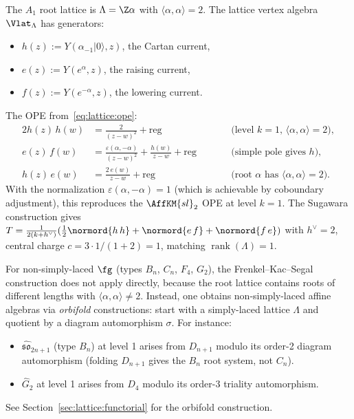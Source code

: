 \begin{example}
\label{ex:lattice:sl2-fks}
The $A_1$ root lattice is $\Lambda = \Z\alpha$ with
$\langle\alpha,\alpha\rangle = 2$.
The lattice vertex algebra $\Vlat_\Lambda$ has generators:
\begin{itemize}
\item $h(z) := Y(\alpha_{-1}|0\rangle, z)$, the Cartan current,
\item $e(z) := Y(e^\alpha, z)$, the raising current,
\item $f(z) := Y(e^{-\alpha}, z)$, the lowering current.
\end{itemize}
The OPE from~\eqref{eq:lattice:ope}:
\begin{alignat*}{2}
h(z)\,h(w) &= \frac{2}{(z-w)^2} + \text{reg}
 &\qquad &\text{(level $k = 1$, $\langle\alpha,\alpha\rangle = 2$)}, \\
e(z)\,f(w)
&= \frac{\varepsilon(\alpha,-\alpha)}{(z-w)^2}
 + \frac{h(w)}{z-w} + \text{reg}
 &\qquad &\text{(simple pole gives $h$)}, \\
h(z)\,e(w) &= \frac{2\,e(w)}{z-w} + \text{reg}
 &\qquad &\text{(root $\alpha$ has $\langle\alpha,\alpha\rangle=2$)}.
\end{alignat*}
With the normalization $\varepsilon(\alpha,-\alpha) = 1$ (which is
achievable by coboundary adjustment), this reproduces the $\AffKM{sl}_2$
OPE at level $k=1$. The Sugawara construction gives
$T = \frac{1}{2(k+h^\vee)}(\frac{1}{2}\normord{h\,h} +
\normord{e\,f} + \normord{f\,e})$
with $h^\vee = 2$, central charge $c = 3 \cdot 1/(1+2) = 1$,
matching $\operatorname{rank}(\Lambda) = 1$.
\end{example}

\begin{remark}\label{rem:lattice:non-simply-laced}
For non-simply-laced $\fg$ (types $B_n$, $C_n$, $F_4$, $G_2$),
the Frenkel--Kac--Segal construction does not apply directly, because
the root lattice contains roots of different lengths with
$\langle\alpha,\alpha\rangle \neq 2$. Instead, one obtains
non-simply-laced affine algebras via \emph{orbifold} constructions:
start with a simply-laced lattice $\Lambda$ and quotient by a
diagram automorphism $\sigma$. For instance:
\begin{itemize}
\item $\widehat{\mathfrak{so}}_{2n+1}$ (type $B_n$) at level 1 arises from $D_{n+1}$ modulo its
 order-2 diagram automorphism (folding $D_{n+1}$ gives the $B_n$ root system, not $C_n$).
\item $\widehat{G}_2$ at level 1 arises from $D_4$ modulo its order-3
 triality automorphism.
\end{itemize}
See Section~\ref{sec:lattice:functorial} for the orbifold construction.
\end{remark}


